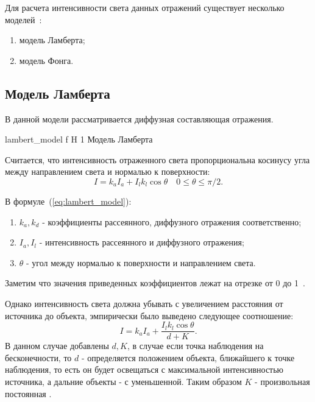 Для расчета интенсивности света данных отражений существует несколько моделей~\cite{Rodgers}:
\begin{enumerate}
	\item модель Ламберта;
	\item модель Фонга.
\end{enumerate}

\subsection{Модель Ламберта}
В данной модели рассматривается диффузная составляющая отражения.


{lambert_model} %
{f} %
{H} %
{1\textwidth} %
{Модель Ламберта} %



Считается, что интенсивность отраженного света
пропорциональна косинусу угла между направлением света и нормалью к поверхности:
\begin{equation} 
	I = k_aI_a + I_lk_l\cos\theta \quad 0 \leq \theta \leq \pi/2.
	\label{eq:lambert_model}
\end{equation}

В  формуле~(\ref{eq:lambert_model}):
\begin{enumerate}
	\item $k_a,k_d$ - коэффициенты рассеянного, диффузного отражения соответственно;
	\item $I_a,I_l$ - интенсивность рассеянного и диффузного отражения;
	\item $\theta$ - угол между нормалью к поверхности и направлением света.
\end{enumerate}
Заметим что значения приведенных коэффициентов лежат на отрезке от 0 до 1~\cite{Rodgers}.

Однако интенсивность света должна убывать с увеличением расстояния от источника до объекта, эмпирически было выведено следующее соотношение:
\begin{equation} 
	I = k_aI_a + \frac{I_lk_l\cos\theta}{d + K}.
	\label{eq:lambert_model_space}
\end{equation}
В данном случае добавлены $d,K$, в случае если точка наблюдения на бесконечности, то $d$ - определяется положением объекта,
ближайшего к точке наблюдения, то есть он будет освещаться с максимальной интенсивностью источника, а дальние объекты - с уменьшенной.
Таким образом $K$ - произвольная постоянная \cite{Rodgers}.


